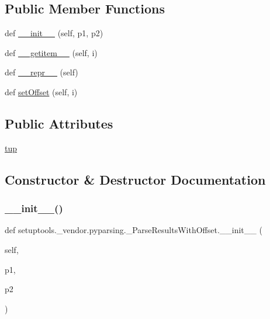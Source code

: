 \subsection*{Public Member Functions}
\begin{DoxyCompactItemize}
\item 
def \hyperlink{classsetuptools_1_1__vendor_1_1pyparsing_1_1__ParseResultsWithOffset_a42a6c67b4d51b835ad4c0813c7542af5}{\+\_\+\+\_\+init\+\_\+\+\_\+} (self, p1, p2)
\item 
def \hyperlink{classsetuptools_1_1__vendor_1_1pyparsing_1_1__ParseResultsWithOffset_a96b0de38c14f63716fedf3e2b1ffe45e}{\+\_\+\+\_\+getitem\+\_\+\+\_\+} (self, i)
\item 
def \hyperlink{classsetuptools_1_1__vendor_1_1pyparsing_1_1__ParseResultsWithOffset_a83e1743d828b7eba207b6bc011542792}{\+\_\+\+\_\+repr\+\_\+\+\_\+} (self)
\item 
def \hyperlink{classsetuptools_1_1__vendor_1_1pyparsing_1_1__ParseResultsWithOffset_af3edd08a032755d17988cef4746177eb}{set\+Offset} (self, i)
\end{DoxyCompactItemize}
\subsection*{Public Attributes}
\begin{DoxyCompactItemize}
\item 
\hyperlink{classsetuptools_1_1__vendor_1_1pyparsing_1_1__ParseResultsWithOffset_a3426ca5b82d2d96f39d713952daa6201}{tup}
\end{DoxyCompactItemize}


\subsection{Constructor \& Destructor Documentation}
\mbox{\label{classsetuptools_1_1__vendor_1_1pyparsing_1_1__ParseResultsWithOffset_a42a6c67b4d51b835ad4c0813c7542af5}} 
\subsubsection{\texorpdfstring{\+\_\+\+\_\+init\+\_\+\+\_\+()}{\_\_init\_\_()}}
{\footnotesize\ttfamily def setuptools.\+\_\+vendor.\+pyparsing.\+\_\+\+Parse\+Results\+With\+Offset.\+\_\+\+\_\+init\+\_\+\+\_\+ (\begin{DoxyParamCaption}\item[{}]{self,  }\item[{}]{p1,  }\item[{}]{p2 }\end{DoxyParamCaption})}



